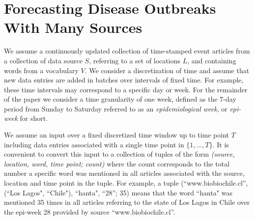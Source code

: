\documentclass[twoside,leqno,twocolumn]{article}
\newcommand{\squishlist}{
   \begin{list}{$\bullet$}
    {
      \setlength{\itemsep}{0pt}
      \setlength{\parsep}{3pt}
      \setlength{\topsep}{3pt}
      \setlength{\partopsep}{0pt}
      \setlength{\leftmargin}{1.5em}
      \setlength{\labelwidth}{1em}
      \setlength{\labelsep}{0.5em} } }
\newcommand{\squishend}{
    \end{list}  }
\newcommand{\model}{{STAT}\xspace} %
\newcommand{\fullmodel}{{{\sf SourceSeer}}\xspace}
\begin{document}
%
%

\section{Forecasting Disease Outbreaks With Many Sources}
\label{sec:problem}
We assume a continuously updated collection of time-stamped event articles from a collection of data source $S$, referring to a set of locations $L$, and containing words from a vocabulary $V$. We consider a discretization of time and assume that new data entries are added in batches over intervals of fixed time. For example, these time intervals may correspond to a specific day or week. For the remainder of the paper we consider a time granularity of one week, defined as the 7-day period from Sunday to Saturday referred to as an {\em epidemiological week}, or {\em epi-week} for short. 

We assume an input over a fixed discretized time window up to time point $T$ including data entries associated with a single time point in $\{1, \dots,T\}$. It is convenient to convert this input to a collection of tuples of the form {\em (source, location, word, time point; count)} where the count corresponds to the total number a specific word was mentioned in all articles associated with the source, location and time point in the tuple. For example, a tuple (``www.biobiochile.cl'', (``Los Lagos", ``Chile"), ``hanta", ``28''; 35) means that the word ``hanta" was mentioned 35 times in all articles referring to the state of Los Lagos in Chile over the epi-week 28 provided by source ``www.biobiochile.cl''.  
\end{document}
